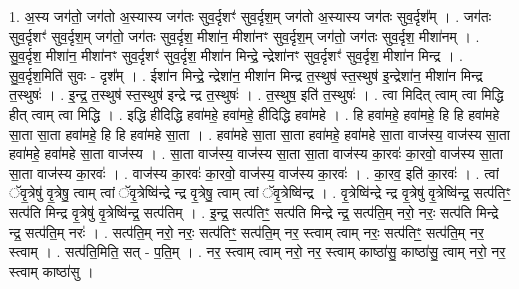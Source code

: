 \documentclass[17pt]{extarticle}
\begin{document}
1. अ॒स्य जग॑तो॒ जग॑तो अ॒स्यास्य जग॑तः सुव॒र्दृशꣳ॑ सुव॒र्दृश॒म् जग॑तो अ॒स्यास्य जग॑तः सुव॒र्दृश᳚म् । . जग॑तः सुव॒र्दृशꣳ॑ सुव॒र्दृश॒म् जग॑तो॒ जग॑तः सुव॒र्दृश॒ मीशा॑न॒ मीशा॑नꣳ सुव॒र्दृश॒म् जग॑तो॒ जग॑तः सुव॒र्दृश॒ मीशा॑नम् । . सु॒व॒र्दृश॒ मीशा॑न॒ मीशा॑नꣳ सुव॒र्दृशꣳ॑ सुव॒र्दृश॒ मीशा॑न मिन्द्रे॒ न्द्रेशा॑नꣳ सुव॒र्दृशꣳ॑ सुव॒र्दृश॒ मीशा॑न मिन्द्र । . सु॒व॒र्दृश॒मिति॑ सुवः - दृश᳚म् । . ईशा॑न मिन्द्रे॒ न्द्रेशा॑न॒ मीशा॑न मिन्द्र त॒स्थुष॑ स्त॒स्थुष॑ इ॒न्द्रेशा॑न॒ मीशा॑न मिन्द्र त॒स्थुषः॑ । . इ॒न्द्र॒ त॒स्थुष॑ स्त॒स्थुष॑ इन्द्रे न्द्र त॒स्थुषः॑ । . त॒स्थुष॒ इति॑ त॒स्थुषः॑ । . त्वा मिदित् त्वाम् त्वा मिद्धि हीत् त्वाम् त्वा मिद्धि । . इद्धि हीदिद्धि हवा॑महे॒ हवा॑महे॒ हीदिद्धि हवा॑महे । . हि हवा॑महे॒ हवा॑महे॒ हि हि हवा॑महे सा॒ता सा॒ता हवा॑महे॒ हि हि हवा॑महे सा॒ता । . हवा॑महे सा॒ता सा॒ता हवा॑महे॒ हवा॑महे सा॒ता वाज॑स्य॒ वाज॑स्य सा॒ता हवा॑महे॒ हवा॑महे सा॒ता वाज॑स्य । . सा॒ता वाज॑स्य॒ वाज॑स्य सा॒ता सा॒ता वाज॑स्य का॒रवः॑ का॒रवो॒ वाज॑स्य सा॒ता सा॒ता वाज॑स्य का॒रवः॑ । . वाज॑स्य का॒रवः॑ का॒रवो॒ वाज॑स्य॒ वाज॑स्य का॒रवः॑ । . का॒रव॒ इति॑ का॒रवः॑ । . त्वां ॅवृ॒त्रेषु॑ वृ॒त्रेषु॒ त्वाम् त्वां ॅवृ॒त्रेष्वि॑न्द्रे न्द्र वृ॒त्रेषु॒ त्वाम् त्वां ॅवृ॒त्रेष्वि॑न्द्र । . वृ॒त्रेष्वि॑न्द्रे न्द्र वृ॒त्रेषु॑ वृ॒त्रेष्वि॑न्द्र॒ सत्प॑तिꣳ॒॒ सत्प॑ति मिन्द्र वृ॒त्रेषु॑ वृ॒त्रेष्वि॑न्द्र॒ सत्प॑तिम् । . इ॒न्द्र॒ सत्प॑तिꣳ॒॒ सत्प॑ति मिन्द्रे न्द्र॒ सत्प॑ति॒म् नरो॒ नरः॒ सत्प॑ति मिन्द्रे न्द्र॒ सत्प॑ति॒म् नरः॑ । . सत्प॑ति॒म् नरो॒ नरः॒ सत्प॑तिꣳ॒॒ सत्प॑ति॒म् नर॒ स्त्वाम् त्वाम् नरः॒ सत्प॑तिꣳ॒॒ सत्प॑ति॒म् नर॒ स्त्वाम् । . सत्प॑ति॒मिति॒ सत् - प॒ति॒म् । . नर॒ स्त्वाम् त्वाम् नरो॒ नर॒ स्त्वाम् काष्ठा॑सु॒ काष्ठा॑सु॒ त्वाम् नरो॒ नर॒ स्त्वाम् काष्ठा॑सु । \newline
\end{document}
